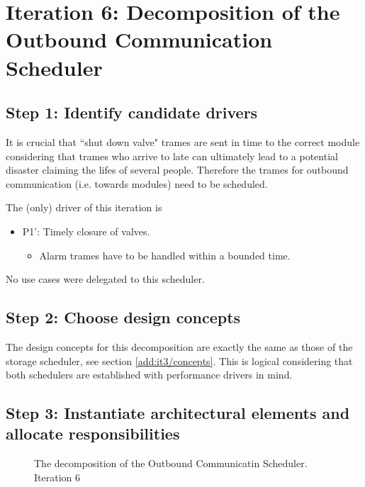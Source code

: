 \section{Iteration 6: Decomposition of the Outbound Communication Scheduler}
\label{add:it6}

\subsection{Step 1: Identify candidate drivers}
\label{add:it6/drivers}

\npar It is crucial that ``shut down valve" trames are sent in time to the
correct module considering that trames who arrive to late can ultimately
lead to a potential disaster claiming the lifes of several people. Therefore the
trames for outbound communication (i.e. towards modules) need to be
scheduled. 

\npar The (only) driver of this iteration is 

\begin{itemize}
  	\item P1': Timely closure of valves.
  	\begin{itemize}
  		\item Alarm trames have to be handled within a bounded time. 
    \end{itemize}
\end{itemize}

\npar No use cases were delegated to this scheduler.

\subsection{Step 2: Choose design concepts}
\label{add:it6/concepts}

\npar The design concepts for this decomposition are exactly the same as those
of the storage scheduler, see section \ref{add:it3/concepts}. This is logical
considering that both schedulers are established with performance drivers in
mind.

\subsection{Step 3: Instantiate architectural elements and allocate responsibilities}
\label{add:it6/elements}

\begin{figure}[H]
	\begin{centering}
		\caption{The decomposition of the Outbound Communicatin Scheduler. Iteration
		6}
		\label{fig:add/it6/decomposition}
	\end{centering}
\end{figure}

